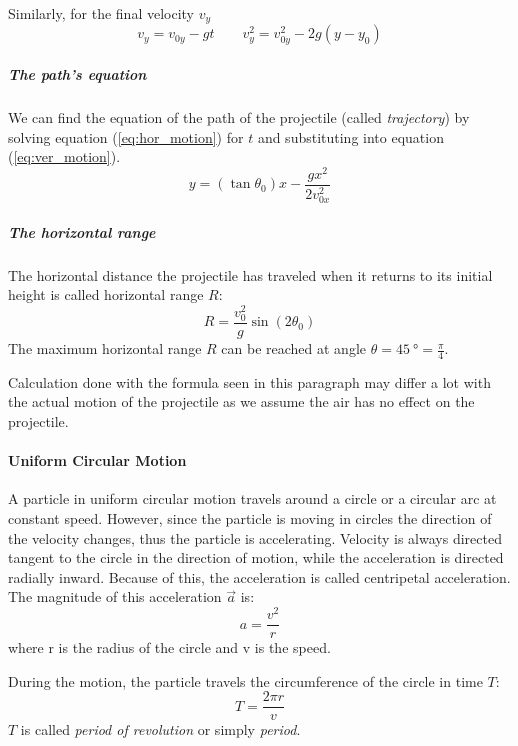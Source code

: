 \documentclass{scrartcl}
\begin{document}
    Similarly, for the final velocity $v_y$
    \begin{equation}
        v_y = v_{0y} - gt\qquad v^2_y = v_{0y}^2 - 2g(y-y_0)
    \end{equation}
    \subparagraph{The path's equation} We can find the equation of the path of the projectile (called \emph{trajectory}) by solving equation (\ref{eq:hor_motion}) for $t$ and substituting into equation (\ref{eq:ver_motion}).
    \begin{equation}
        y = (\tan \theta_0)x - \frac{gx^2}{2v_{0x}^2}
    \end{equation}
    \subparagraph{The horizontal range} The horizontal distance the projectile has traveled when it returns to its initial height is called horizontal range $R$:
    \begin{equation}
        R = \frac{v^2_0}{g} \sin(2\theta_0)
    \end{equation}
    The maximum horizontal range $R$ can be reached at angle $\theta = \SI{45}{\degree}=\frac{\pi}{4}$.
    
    Calculation done with the formula seen in this paragraph may differ a lot with the actual motion of the projectile as we assume the air has no effect on the projectile. 
    
    \paragraph{Uniform Circular Motion} A particle in uniform circular motion travels around a circle or a circular arc at constant speed. However, since the particle is moving in circles the direction of the velocity changes, thus the particle is accelerating. Velocity is always directed tangent to the circle in the direction of motion, while the acceleration is directed radially inward. Because of this, the acceleration is called centripetal acceleration. The magnitude of this acceleration $\vec{a}$ is:
    \begin{equation}
        a = \frac{v^2}{r}
    \end{equation}
    where r is the radius of the circle and v is the speed.
    
    During the motion, the particle travels the circumference of the circle in time $T$:
    \begin{equation}
        T = \frac{2\pi r}{v}
    \end{equation}
    $T$ is called \emph{period of revolution} or simply \emph{period}.
    
\end{document}
